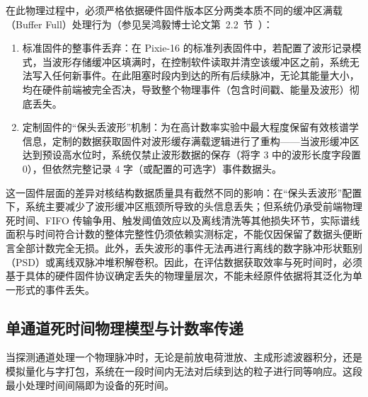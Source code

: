 在此物理过程中，必须严格依据硬件固件版本区分两类本质不同的缓冲区满载（Buffer Full）处理行为（参见吴鸿毅博士论文第~2.2~节~\cite[印刷第~43--44~页]{wu-hongyi-2020-general-purpose-digital-daq-thesis}）：
\begin{enumerate}
\item 标准固件的整事件丢弃：在 Pixie-16 的标准列表固件中，若配置了波形记录模式，当波形存储缓冲区填满时，在控制软件读取并清空该缓冲区之前，系统无法写入任何新事件。在此阻塞时段内到达的所有后续脉冲，无论其能量大小，均在硬件前端被完全否决，导致整个物理事件（包含时间戳、能量及波形）彻底丢失。
\item 定制固件的“保头丢波形”机制：为在高计数率实验中最大程度保留有效核谱学信息，定制的数据获取固件对波形缓存满载逻辑进行了重构——当波形缓冲区达到预设高水位时，系统仅禁止波形数据的保存（将字 3 中的波形长度字段置 0），但依然完整记录 4 字（或配置的可选字）事件数据头。
\end{enumerate}
这一固件层面的差异对核结构数据质量具有截然不同的影响：在“保头丢波形”配置下，系统主要减少了波形缓冲区瓶颈所导致的头信息丢失；但系统仍承受前端物理死时间、FIFO 传输争用、触发阈值效应以及离线清洗等其他损失环节，实际谱线面积与时间符合计数的整体完整性仍须依赖实测标定，不能仅因保留了数据头便断言全部计数完全无损。此外，丢失波形的事件无法再进行离线的数字脉冲形状甄别（PSD）或离线双脉冲堆积解卷积。因此，在评估数据获取效率与死时间时，必须基于具体的硬件固件协议确定丢失的物理量层次，不能未经原件依据将其泛化为单一形式的事件丢失。

\subsection{单通道死时间物理模型与计数率传递}\label{subsec:5-5-3}

当探测通道处理一个物理脉冲时，无论是前放电荷泄放、主成形滤波器积分，还是模拟量化与字打包，系统在一段时间内无法对后续到达的粒子进行同等响应。这段最小处理时间间隔即为设备的死时间。

